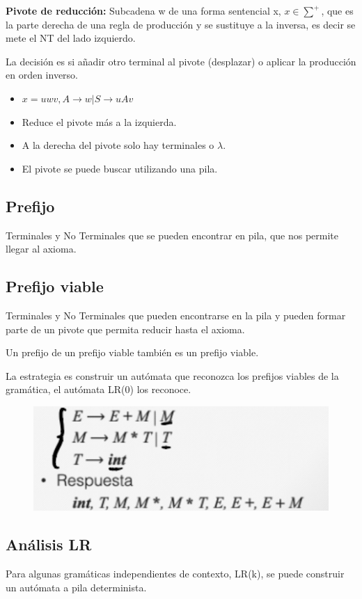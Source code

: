 \documentclass[12pt]{report} %
\begin{document}
\textbf{Pivote de reducción:} Subcadena w de una forma sentencial x, $x \in \sum^+$, que es la parte derecha de una regla de producción y se sustituye a la inversa, es decir se mete el NT del lado izquierdo. 

La decisión es si añadir otro terminal al pivote (desplazar) o aplicar la producción en orden inverso.
\begin{itemize}
  \item $x=uwv, A \rightarrow w | S \rightarrow uAv$
  \item Reduce el pivote más a la izquierda.
  \item A la derecha del pivote solo hay terminales o $\lambda$.
  \item El pivote se puede buscar utilizando una pila.
\end{itemize}

\subsection{Prefijo} 
Terminales y No Terminales que se pueden encontrar en pila, que nos permite llegar al axioma.

\subsection{Prefijo viable} 
Terminales y No Terminales que pueden encontrarse en la pila y pueden formar parte de un pivote que permita reducir hasta el axioma. 

Un prefijo de un prefijo viable también es un prefijo viable.

La estrategia es construir un autómata que reconozca los prefijos viables de la gramática, el autómata LR(0) los reconoce.
\vspace{-10px}
\begin{figure}[H]
	{\includegraphics[scale=.4]{2021-03-26 18_27_20-ASintactico.pdf - Foxit Reader.png}}
\end{figure}
  
\subsection{Análisis LR}
Para algunas gramáticas independientes de contexto, LR(k), se puede construir un autómata a pila determinista.
\end{document}
